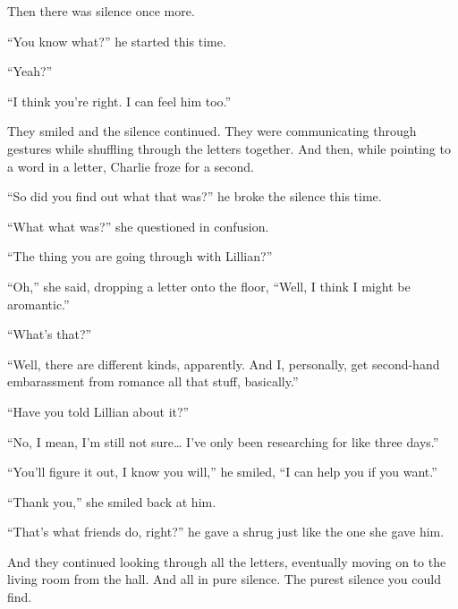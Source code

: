 Then there was silence once more.

“You know what?” he started this time.

“Yeah?”

“I think you're right. I can feel him too.”

They smiled and the silence continued. They were communicating through gestures while shuffling through the letters together. And then, while pointing to a word in a letter, Charlie froze for a second.

“So did you find out what that was?” he broke the silence this time.

“What what was?” she questioned in confusion.

“The thing you are going through with Lillian?”

“Oh,” she said, dropping a letter onto the floor, “Well, I think I might be aromantic.”

“What's that?”

“Well, there are different kinds, apparently. And I, personally, get second-hand embarassment from romance all that stuff, basically.”

“Have you told Lillian about it?”

“No, I mean, I'm still not sure… I've only been researching for like three days.”

“You'll figure it out, I know you will,” he smiled, “I can help you if you want.”

“Thank you,” she smiled back at him.

“That's what friends do, right?” he gave a shrug just like the one she gave him.

And they continued looking through all the letters, eventually moving on to the living room from the hall. And all in pure silence. The purest silence you could find.
